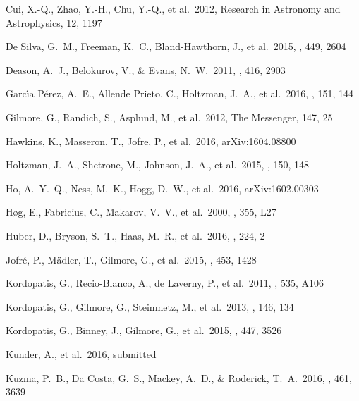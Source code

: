 \documentclass[preprint,trackchanges]{aastex}
\begin{document}
\begin{thebibliography}{dummy}
 Cui, X.-Q., Zhao, Y.-H., Chu, Y.-Q., et al.\ 2012, Research in Astronomy and Astrophysics, 12, 1197 

 De Silva, G.~M., Freeman, K.~C., Bland-Hawthorn, J., et al.\ 2015, \mnras, 449, 2604 

 Deason, A.~J., Belokurov, V., \& Evans, N.~W.\ 2011, \mnras, 416, 2903 

 Garc{\'{\i}}a P{\'e}rez, A.~E., Allende Prieto, C., Holtzman, J.~A., et al.\ 2016, \aj, 151, 144 

 Gilmore, G., Randich, S., Asplund, M., et al.\ 2012, The Messenger, 147, 25

 Hawkins, K., Masseron, T., Jofre, P., et al.\ 2016, arXiv:1604.08800 

 Holtzman, J.~A., Shetrone, M., Johnson, J.~A., et al.\ 2015, \aj, 150, 148 

 Ho, A.~Y.~Q., Ness, M.~K., Hogg, D.~W., et al.\ 2016, arXiv:1602.00303 
 
 H{\o}g, E., Fabricius, C., Makarov, V.~V., et al.\ 2000, \aap, 355, L27 

 Huber, D., Bryson, S.~T., Haas, M.~R., et al.\ 2016, \apjs, 224, 2 

 Jofr{\'e}, P., M{\"a}dler, T., Gilmore, G., et al.\ 2015, \mnras, 453, 1428 

 Kordopatis, G., Recio-Blanco, A., de Laverny, P., et al.\ 2011, \aap, 535, A106 

 Kordopatis, G., Gilmore, G., Steinmetz, M., et al.\ 2013, \aj, 146, 134 

 Kordopatis, G., Binney, J., Gilmore, G., et al.\ 2015, \mnras, 447, 3526 

 Kunder, A., et al.\ 2016, submitted

 Kuzma, P.~B., Da Costa, G.~S., Mackey, A.~D., \& Roderick, T.~A.\ 2016, \mnras, 461, 3639 


\end{thebibliography}
\end{document}
